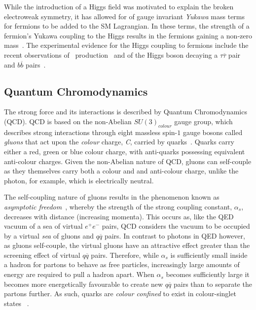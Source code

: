 While the introduction of a Higgs field was motivated to explain the broken electroweak symmetry, it has allowed for of gauge invariant \emph{Yukawa} mass terms for fermions to be added to the SM Lagrangian.
In these terms, the strength of a fermion's Yukawa coupling to the Higgs results in the fermions gaining a non-zero mass~\cite{Cheng:1985bj}.
The experimental evidence for the Higgs coupling to fermions include the recent observations of \ttH~production~\cite{Sirunyan:2018hoz} and of the Higgs boson decaying a $\tau \overline{\tau}$ pair~\cite{CERN-EP-2018-221} and $b \overline{b}$ pairs~\cite{Sirunyan:2017guj}.

\subsection{Quantum Chromodynamics}\label{subsec:QCD}
The strong force and its interactions is described by Quantum Chromodynamics (QCD).
QCD is based on the non-Abelian $SU(3)_{colour}$ gauge group, which describes strong interactions through eight massless spin-$1$ gauge bosons called \emph{gluons} that act upon the \emph{colour} charge, \emph{C}, carried by quarks~\cite{ElectroweakStrong}.
Quarks carry either a red, green or blue colour charge, with anti-quarks possessing equivalent anti-colour charges.
Given the non-Abelian nature of QCD, gluons can self-couple as they themselves carry both a colour and and anti-colour charge, unlike the photon, for example, which is electrically neutral.

The self-coupling nature of gluons results in the phenomenon known as \emph{asymptotic freedom}~\cite{ElectroweakStrong,coughlan2006ideas,devenish2004deep}, whereby the strength of the strong coupling constant, $\alpha_{s}$, decreases with distance (increasing momenta).
This occurs as, like the QED vacuum of a sea of virtual $e^{+}e^{-}$ pairs, QCD considers the vacuum to be occupied by a virtual \emph{sea} of gluons and $q\overline{q}$ pairs.
In contrast to photons in QED however, as gluons self-couple, the virtual gluons have an attractive effect greater than the screening effect of virtual $q\overline{q}$ pairs.
Therefore, while $\alpha_{s}$ is sufficiently small inside a hadron for partons to behave as free particles, increasingly large amounts of energy are required to pull a hadron apart.
When $\alpha_{s}$ becomes sufficiently large it becomes more energetically favourable to create new $q\overline{q}$ pairs than to separate the partons further.
As such, quarks are \emph{colour confined} to exist in colour-singlet states ~\cite{ElectroweakStrong,Griffiths,devenish2004deep}.

